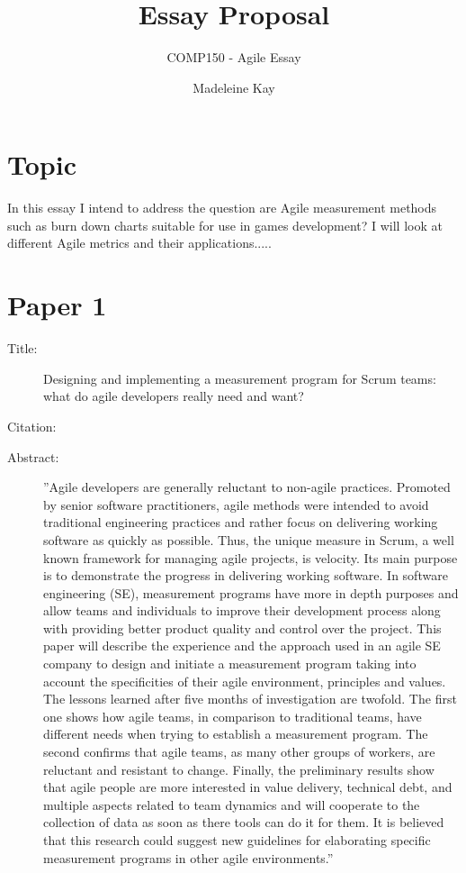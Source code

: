 \documentclass{scrartcl}
\title{Essay Proposal}
\subtitle{COMP150 - Agile Essay}
\author{Madeleine Kay}
\begin{document}
\maketitle

\section*{Topic}
In this essay I intend to address the question are Agile measurement methods such as burn down charts suitable for use in games development? I will look at different Agile metrics and their applications.....

\section*{Paper 1}
\begin{description}
	\item[Title:] Designing and implementing a measurement program for Scrum teams: what do agile developers really need and want?
	\item[Citation:] \cite{Ktata}
	\item[Abstract:] ''Agile developers are generally reluctant to non-agile practices. Promoted by senior software practitioners, agile methods were intended to avoid traditional engineering practices and rather focus on delivering working software as quickly as possible. Thus, the unique measure in Scrum, a well known framework for managing agile projects, is velocity. Its main purpose is to demonstrate the progress in delivering working software. In software engineering (SE), measurement programs have more in depth purposes and allow teams and individuals to improve their development process along with providing better product quality and control over the project. This paper will describe the experience and the approach used in an agile SE company to design and initiate a measurement program taking into account the specificities of their agile environment, principles and values. The lessons learned after five months of investigation are twofold. The first one shows how agile teams, in comparison to traditional teams, have different needs when trying to establish a measurement program. The second confirms that agile teams, as many other groups of workers, are reluctant and resistant to change. Finally, the preliminary results show that agile people are more interested in value delivery, technical debt, and multiple aspects related to team dynamics and will cooperate to the collection of data as soon as there tools can do it for them. It is believed that this research could suggest new guidelines for elaborating specific measurement programs in other agile environments.''

\end{description}
\end{document}
